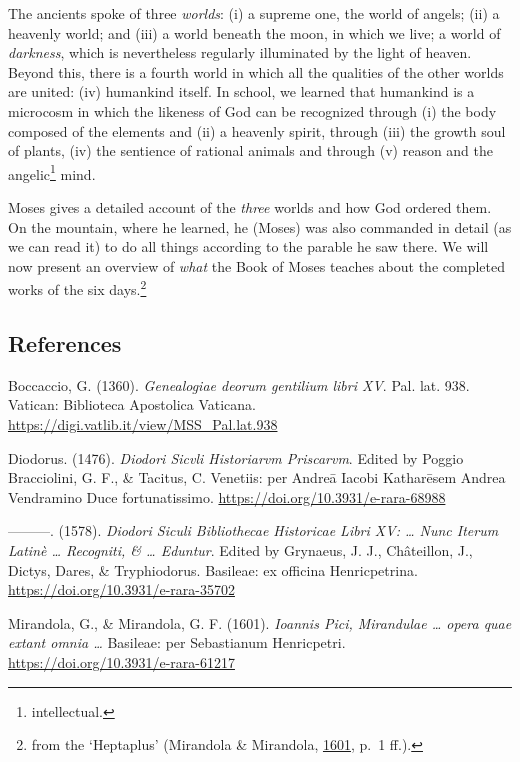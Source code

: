 \documentclass[
]{article}
\begin{document}
The ancients spoke of three \emph{worlds}: (i) a supreme one, the world
of angels; (ii) a heavenly world; and (iii) a world beneath the moon, in
which we live; a world of \emph{darkness}, which is nevertheless
regularly illuminated by the light of heaven. Beyond this, there is a
fourth world in which all the qualities of the other worlds are united:
(iv) humankind itself. In school, we learned that humankind is a
microcosm in which the likeness of God can be recognized through (i) the
body composed of the elements and (ii) a heavenly spirit, through (iii)
the growth soul of plants, (iv) the sentience of rational animals and
through (v) reason and the angelic\footnote{intellectual.} mind.

Moses gives a detailed account of the \emph{three} worlds and how God
ordered them. On the mountain, where he learned, he (Moses) was also
commanded in detail (as we can read it) to do all things according to
the parable he saw there. We will now present an overview of \emph{what}
the Book of Moses teaches about the completed works of the six
days.\footnote{from the `Heptaplus' (Mirandola \& Mirandola,
  \href{https://doi.org/10.3931/e-rara-61217}{1601}, p.~1 ff.).}

\hypertarget{references}{%
\subsection{References}\label{references}}

Boccaccio, G. (1360). \emph{Genealogiae deorum gentilium libri XV}. Pal.
lat. 938. Vatican: Biblioteca Apostolica Vaticana.
\url{https://digi.vatlib.it/view/MSS_Pal.lat.938}

Diodorus. (1476). \emph{Diodori Sicvli Historiarvm Priscarvm}. Edited by
Poggio Bracciolini, G. F., \& Tacitus, C. Venetiis: per Andreā Iacobi
Katharēsem Andrea Vendramino Duce fortunatissimo.
\url{https://doi.org/10.3931/e-rara-68988}

---------. (1578). \emph{Diodori Siculi Bibliothecae Historicae Libri
XV: \ldots{} Nunc Iterum Latinè \ldots{} Recogniti, \& \ldots{}
Eduntur}. Edited by Grynaeus, J. J., Châteillon, J., Dictys, Dares, \&
Tryphiodorus. Basileae: ex officina Henricpetrina.
\url{https://doi.org/10.3931/e-rara-35702}

Mirandola, G., \& Mirandola, G. F. (1601). \emph{Ioannis Pici,
Mirandulae \ldots{} opera quae extant omnia \ldots{}} Basileae: per
Sebastianum Henricpetri. \url{https://doi.org/10.3931/e-rara-61217}
\end{document}
